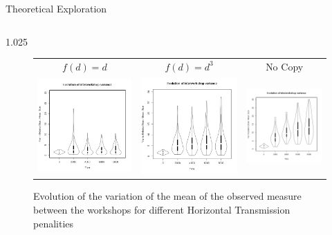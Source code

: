 \documentclass[final]{beamer}
\newlength{\onecolwid}
\newlength{\twocolwid}
\begin{document}
\begin{frame}[t]
\begin{columns}[t]
\begin{column}{\twocolwid}
\begin{block}{Theoretical Exploration}
\begin{columns}[t,totalwidth=\twocolwid]
\begin{column}{1.025\onecolwid}
    \begin{figure}[h!]
    \centering
	\caption{Evolution of the variation of the mean of the observed measure between the workshops for different Horizontal Transmission penalities}
    \begin{tabular}{ccc}
	     $f(d)=d$ & $f(d)=d^3$ & No Copy\\
	    
	    \includegraphics[height=.3\textwidth]{images/lineC.png}
	    &
	    \includegraphics[height=.3\textwidth]{images/cubeC.png}
	    &
	    \includegraphics[height=.3\textwidth]{images/lineNC.png}\\
	\end{tabular}
	\label{fig:resmod}
    \end{figure}


    
\end{column}
\end{columns}

\end{block}
\end{column}



\end{columns}
\end{frame}
\end{document}
